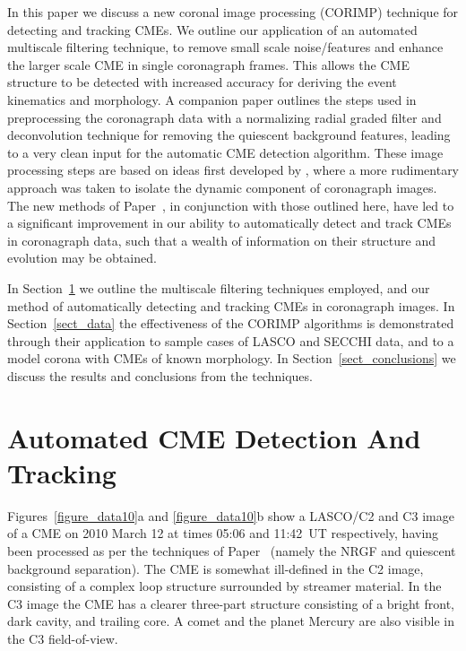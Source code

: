 \documentclass[preprint2]{aastex}
\newcommand{\RNum}[1]{\uppercase\expandafter{\romannumeral #1\relax}}
\begin{document}
In this paper we discuss a new coronal image processing (CORIMP) technique for detecting and tracking CMEs. We outline our application of an automated multiscale filtering technique, to remove small scale noise/features and enhance the larger scale CME in single coronagraph frames. This allows the CME structure to be detected with increased accuracy for deriving the event kinematics and morphology. A companion paper \citep[][hereafter referred to as Paper~\RNum{1}]{2012Paper1} outlines the steps used in preprocessing the coronagraph data with a normalizing radial graded filter \citep[NRGF;][]{2006SoPh..236..263M} and deconvolution technique for removing the quiescent background features, leading to a very clean input for the automatic CME detection algorithm. These image processing steps are based on ideas first developed by \citet{2010ApJ...711..631M}, where a more rudimentary approach was taken to isolate the dynamic component of coronagraph images. The new methods of Paper~\RNum{1}, in conjunction with those outlined here, have led to a significant improvement in our ability to automatically detect and track CMEs in coronagraph data, such that a wealth of information on their structure and evolution may be obtained.

In Section~\ref{sect_automation} we outline the multiscale filtering techniques employed, and our method of automatically detecting and tracking CMEs in coronagraph images. In Section~\ref{sect_data} the effectiveness of the CORIMP algorithms is demonstrated through their application to sample cases of LASCO and SECCHI data, and to a model corona with CMEs of known morphology. In Section~\ref{sect_conclusions} we discuss the results and conclusions from the techniques.


\section{Automated CME Detection And Tracking}
\label{sect_automation}

Figures~\ref{figure_data10}a and \ref{figure_data10}b show a LASCO/C2 and C3 image of a CME on 2010 March 12 at times 05:06 and 11:42~UT respectively, having been processed as per the techniques of Paper~\RNum{1} (namely the NRGF and quiescent background separation). The CME is somewhat ill-defined in the C2 image, consisting of a complex loop structure surrounded by streamer material. In the C3 image the CME has a clearer three-part structure consisting of a bright front, dark cavity, and trailing core. A comet and the planet Mercury are also visible in the C3 field-of-view.   
\end{document}

